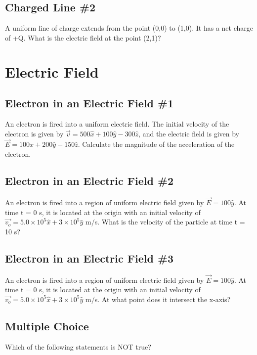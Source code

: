 \documentclass[11pt]{article}
\begin{document}
\subsection{Charged Line \#2}
A uniform line of charge extends from the point (0,0) to (1,0).  It has a net charge of +Q.  What is the electric field at the point (2,1)?


\pagebreak
\section{Electric Field}

\subsection{Electron in an Electric Field \#1}
An electron is fired into a uniform electric field.  The initial velocity of the electron is given by $\vec{v} = 500 \hat{x} + 100 \hat{y} - 300 \hat{z}$, and the electric field is given by $\vec{E} = 100 \hat{x} + 200 \hat{y} - 150 \hat{z}$.  Calculate the magnitude of the acceleration of the electron.

\subsection{Electron in an Electric Field \#2}
An electron is fired into a region of uniform electric field given by $\vec{E} = 100\hat{y}$. At time t = 0 s, it is located at the origin with an initial velocity of $\vec{v_o} = 5.0 \times 10^5 \hat{x} + 3 \times 10^5 \hat{y}$ m/s.  What is the velocity of the particle at time t = 10 s?

\subsection{Electron in an Electric Field \#3}
An electron is fired into a region of uniform electric field given by $\vec{E} = 100\hat{y}$. At time t = 0 s, it is located at the origin with an initial velocity of $\vec{v_o} = 5.0 \times 10^5 \hat{x} + 3 \times 10^5 \hat{y}$ m/s.  At what point does it intersect the x-axis?

\subsection{Multiple Choice}
Which of the following statements is NOT true?
\end{document}
